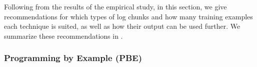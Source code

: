 \documentclass[10pt,journal,compsoc]{IEEEtran}
\begin{document}
Following from the results of the empirical study, in this section,
we give recommendations for
which types of log chunks and how many training examples
each technique is suited, as well as
how their output can be used further.
We summarize these recommendations in
.

\begin{table}[tbp]
\caption{Recommendations for each of the investigated chunk retrieval
techniques.}
\label{tab:single-technique-recommendations}

\end{table}

\subsubsection{Programming by Example (PBE)}
\end{document}
